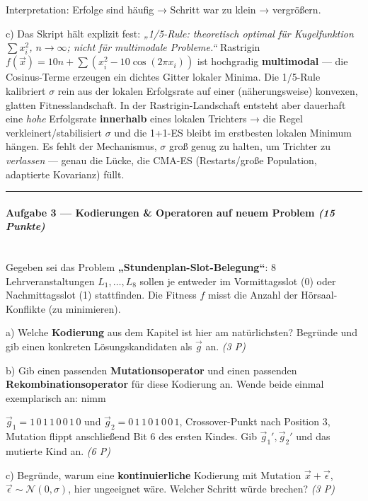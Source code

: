 \documentclass[11pt, a4paper]{article}
\begin{document}
Interpretation: Erfolge sind häufig → Schritt war zu klein → vergrößern.


c) Das Skript hält explizit fest: \textit{„1/5-Rule: theoretisch optimal für Kugelfunktion $\sum x_i^2$, $n\to\infty$; nicht für multimodale Probleme.“} Rastrigin $f(\vec x) = 10n + \sum (x_i^2 - 10\cos(2\pi x_i))$ ist hochgradig \textbf{multimodal} — die Cosinus-Terme erzeugen ein dichtes Gitter lokaler Minima. Die 1/5-Rule kalibriert $\sigma$ rein aus der lokalen Erfolgsrate auf einer (näherungsweise) konvexen, glatten Fitnesslandschaft. In der Rastrigin-Landschaft entsteht aber dauerhaft eine \textit{hohe} Erfolgsrate \textbf{innerhalb} eines lokalen Trichters → die Regel verkleinert/stabilisiert $\sigma$ und die 1+1-ES bleibt im erstbesten lokalen Minimum hängen. Es fehlt der Mechanismus, $\sigma$ groß genug zu halten, um Trichter zu \textit{verlassen} — genau die Lücke, die CMA-ES (Restarts/große Population, adaptierte Kovarianz) füllt.



\noindent\textcolor{rulegray}{\rule{\linewidth}{0.4pt}}


\paragraph{Aufgabe 3 — Kodierungen \& Operatoren auf neuem Problem \textit{(15 Punkte)}}\mbox{}\\[2pt]

Gegeben sei das Problem \textbf{„Stundenplan-Slot-Belegung“}: 8 Lehrveranstaltungen $L_1, \dots, L_8$ sollen je entweder im Vormittagsslot (0) oder Nachmittagsslot (1) stattfinden. Die Fitness $f$ misst die Anzahl der Hörsaal-Konflikte (zu minimieren).


a) Welche \textbf{Kodierung} aus dem Kapitel ist hier am natürlichsten? Begründe und gib einen konkreten Lösungskandidaten als $\vec g$ an. \textit{(3 P)}


b) Gib einen passenden \textbf{Mutationsoperator} und einen passenden \textbf{Rekombinationsoperator} für diese Kodierung an. Wende beide einmal exemplarisch an: nimm

$\vec g_1 = 1\,0\,1\,1\,0\,0\,1\,0$ und $\vec g_2 = 0\,1\,1\,0\,1\,0\,0\,1$, Crossover-Punkt nach Position 3, Mutation flippt anschließend Bit 6 des ersten Kindes. Gib $\vec g_1', \vec g_2'$ und das mutierte Kind an. \textit{(6 P)}


c) Begründe, warum eine \textbf{kontinuierliche} Kodierung mit Mutation $\vec x + \vec\epsilon$, $\vec\epsilon \sim \mathcal N(0,\sigma)$, hier ungeeignet wäre. Welcher Schritt würde brechen? \textit{(3 P)}
\end{document}
